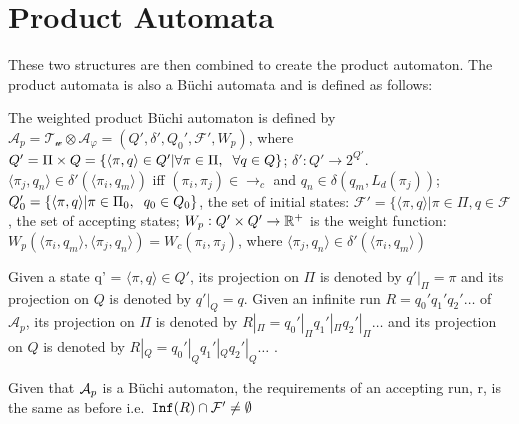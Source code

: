 \section{Product Automata}
These two structures are then combined to create the product automaton. The product automata is also a B\"{u}chi automata and is defined as follows:
\begin{definition}
The weighted product B\"{u}chi automaton is defined by $\mathcal{A}_p = \mathcal{T_w} \otimes \mathcal{A}_\varphi = (Q', \delta', Q_0', \mathcal{F}', W_p)$, where $Q' = \Pi \times Q = \{ \langle \pi, q \rangle \in Q' | \forall \pi \in \Pi, \hspace{0.2cm} \forall q \in Q \}$; $\delta': Q' \rightarrow 2^{Q'}$. $\langle \pi_j, q_n \rangle \in \delta' (\langle \pi_i, q_m \rangle )$ iff $(\pi_i , \pi_j ) \in \rightarrow_c$ and $q_n \in \delta (q_m, L_d(\pi_j))$; $Q_0' = \{ \langle \pi , q \rangle | \pi \in \Pi_0, \hspace{0.2cm} q_0 \in Q_0\}$, the set of initial states: $\mathcal{F}' = \{ \langle \pi, q \rangle | \pi \in \Pi, q \in \mathcal{F}$, the set of accepting states; $W_p: Q' \times Q' \rightarrow \mathbb{R}^+$ is the weight function: $W_p(\langle \pi_i, q_m \rangle , \langle \pi_j, q_n \rangle ) = W_c (\pi_i, \pi_j)$, where $\langle \pi_j, q_n \rangle \in \delta' ( \langle \pi_i, q_m \rangle )$
\end{definition} 

Given a state q' = $\langle \pi, q \rangle \in Q'$, its projection on $\Pi$ is denoted by $q'|_\Pi = \pi$ and its projection on $Q$ is denoted by $q'|_Q = q$. Given an infinite run $R = q_0' q_1' q_2' \dots$ of $\mathcal{A}_p$, its projection on $\Pi$ is denoted by $R|_\Pi = q_0'|_\Pi q_1'|_\Pi q_2'|_\Pi \dots$ and its projection on $Q$ is denoted by $R|_Q  = q_0'|_Q q_1'|_Q q_2'|_Q \dots$ \cite{guo15}. 

Given that $\mathcal{A}_p$ is a B\"{u}chi automaton, the requirements of an accepting run, r, is the same as before i.e.\ $\texttt{Inf}(R) \cap \mathcal{F}' \neq \emptyset$

%
%


